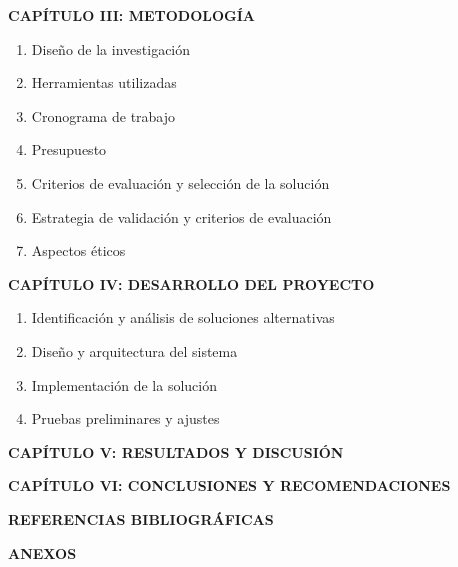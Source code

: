\textbf{CAPÍTULO III: METODOLOGÍA}
\begin{enumerate}[label=3.\arabic*]
    \item Diseño de la investigación
    \item Herramientas utilizadas
    \item Cronograma de trabajo
    \item Presupuesto
    \item Criterios de evaluación y selección de la solución
    \item Estrategia de validación y criterios de evaluación
    \item Aspectos éticos
\end{enumerate}

\textbf{CAPÍTULO IV: DESARROLLO DEL PROYECTO}
\begin{enumerate}[label=4.\arabic*]
    \item Identificación y análisis de soluciones alternativas
    \item Diseño y arquitectura del sistema
    \item Implementación de la solución
    \item Pruebas preliminares y ajustes
\end{enumerate}

\textbf{CAPÍTULO V: RESULTADOS Y DISCUSIÓN}\par

\textbf{CAPÍTULO VI: CONCLUSIONES Y RECOMENDACIONES}\par



\textbf{REFERENCIAS BIBLIOGRÁFICAS}\par

\textbf{ANEXOS}\par